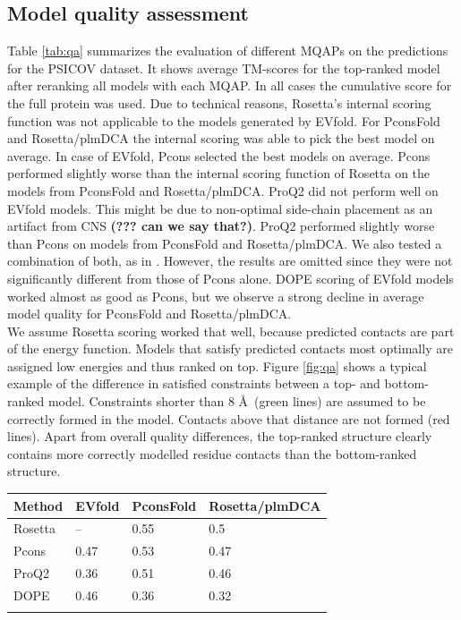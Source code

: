 \documentclass{bioinfo}
\begin{document}
\subsection{Model quality assessment}
Table \ref{tab:qa} summarizes the evaluation of different MQAPs on the predictions for the PSICOV dataset. It shows average TM-scores for the top-ranked model after reranking all models with each MQAP. In all cases the cumulative score for the full protein was used. Due to technical reasons, Rosetta's internal scoring function was not applicable to the models generated by EVfold. For PconsFold and Rosetta/plmDCA the internal scoring was able to pick the best model on average. In case of EVfold, Pcons selected the best models on average. Pcons performed slightly worse than the internal scoring function of Rosetta on the models from PconsFold and Rosetta/plmDCA. ProQ2 did not perform well on EVfold models. This might be due to non-optimal side-chain placement as an artifact from CNS {\bf(??? can we say that?)}. ProQ2 performed slightly worse than Pcons on models from PconsFold and Rosetta/plmDCA. We also tested a combination of both, as in \citeauthor{wallner_pcons.net:_2007} \citeyear{wallner_pcons.net:_2007}. However, the results are omitted since they were not significantly different from those of Pcons alone. DOPE scoring of EVfold models worked almost as good as Pcons, but we observe a strong decline in average model quality for PconsFold and Rosetta/plmDCA. \\\indent
We assume Rosetta scoring worked that well, because predicted contacts are part of the energy function. Models that satisfy predicted contacts most optimally are assigned low energies and thus ranked on top. Figure \ref{fig:qa} shows a typical example of the difference in satisfied constraints between a top- and bottom-ranked model. Constraints shorter than 8 \AA\ (green lines) are assumed to be correctly formed in the model. Contacts above that distance are not formed (red lines). Apart from overall quality differences, the top-ranked structure clearly contains more correctly modelled residue contacts than the bottom-ranked structure.\\\indent

\begin{table}[!t]
{\begin{tabular}{llll}\toprule
    Method  & EVfold & PconsFold & Rosetta/plmDCA \\ \midrule
    Rosetta & --     & 0.55     & 0.5          \\
    Pcons   & 0.47  & 0.53     & 0.47          \\
    ProQ2   & 0.36  & 0.51     & 0.46          \\
    DOPE    & 0.46  & 0.36     & 0.32           \\ \botrule
\end{tabular}}{}
\end{table}
\end{document}
